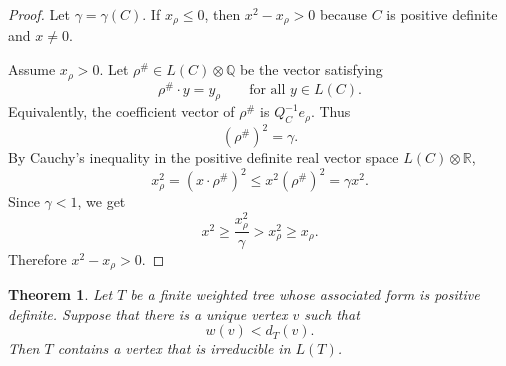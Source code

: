 \documentclass[11pt]{article}
\newtheorem{theorem}{Theorem}
\begin{document}
\begin{proof}
Let \(\gamma=\gamma(C)\). If \(x_\rho\le 0\), then \(x^2-x_\rho>0\) because \(C\) is positive definite and \(x\ne 0\).

Assume \(x_\rho>0\). Let \(\rho^\#\in L(C)\otimes \mathbb Q\) be the vector satisfying
\[
\rho^\#\cdot y=y_\rho
\qquad
\text{for all } y\in L(C).
\]
Equivalently, the coefficient vector of \(\rho^\#\) is \(Q_C^{-1}e_\rho\). Thus
\[
(\rho^\#)^2=\gamma.
\]
By Cauchy's inequality in the positive definite real vector space \(L(C)\otimes\mathbb R\),
\[
x_\rho^2=(x\cdot \rho^\#)^2\le x^2(\rho^\#)^2=\gamma x^2.
\]
Since \(\gamma<1\), we get
\[
x^2\ge \frac{x_\rho^2}{\gamma}>x_\rho^2\ge x_\rho.
\]
Therefore \(x^2-x_\rho>0\).
\end{proof}

\begin{theorem}
Let \(T\) be a finite weighted tree whose associated form is positive definite. Suppose that there is a unique vertex \(v\) such that
\[
w(v)<d_T(v).
\]
Then \(T\) contains a vertex that is irreducible in \(L(T)\).
\end{theorem}
\end{document}
